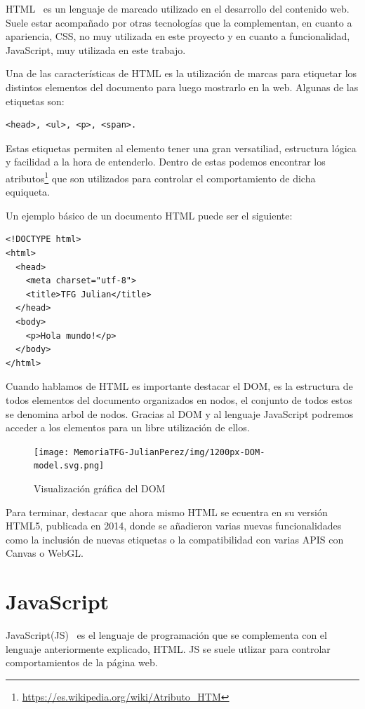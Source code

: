 \documentclass[a4paper, 12pt]{book}
\begin{document}
HTML~\cite{HTML} es un lenguaje de marcado utilizado en el desarrollo del contenido web. Suele estar acompañado por otras tecnologías que la complementan, en cuanto a apariencia, CSS, no muy utilizada en este proyecto y en cuanto a funcionalidad, JavaScript, muy utilizada en este trabajo.

Una de las características de HTML es la utilización de marcas para etiquetar los distintos elementos del documento para luego mostrarlo en la web. Algunas de las etiquetas son: \begin{verbatim}<head>, <ul>, <p>, <span>.\end{verbatim} 

Estas etiquetas permiten al elemento tener una gran versatiliad, estructura lógica y facilidad a la hora de entenderlo. Dentro de estas podemos encontrar los atributos\footnote{\url{https://es.wikipedia.org/wiki/Atributo_HTM}} que son utilizados para controlar el comportamiento de dicha equiqueta.

Un ejemplo básico de un documento HTML puede ser el siguiente:

\begin{verbatim}
<!DOCTYPE html>
<html>
  <head>
    <meta charset="utf-8">
    <title>TFG Julian</title>
  </head>
  <body>
    <p>Hola mundo!</p>
  </body>
</html>
\end{verbatim}
Cuando hablamos de HTML es importante destacar el DOM, es la estructura de todos elementos del documento organizados en nodos, el conjunto de todos estos se denomina arbol de nodos. Gracias al DOM y al lenguaje JavaScript podremos acceder a los elementos para un libre utilización de ellos.


\begin{figure}[H]
  \centering
  \texttt{[image: MemoriaTFG-JulianPerez/img/1200px-DOM-model.svg.png]}
  \caption{Visualización gráfica del DOM}\label{html}
\end{figure}


Para terminar, destacar que ahora mismo HTML se ecuentra en su versión HTML5, publicada en 2014, donde se añadieron varias nuevas funcionalidades como la inclusión de nuevas etiquetas o la compatibilidad con varias APIS con Canvas o WebGL.
\section{JavaScript} %
\label{sec:JavaScript}

JavaScript(JS)~\cite{eloquent} es el lenguaje de programación que se complementa con el lenguaje anteriormente explicado, HTML. JS se suele utlizar para controlar comportamientos de la página web.
\end{document}
